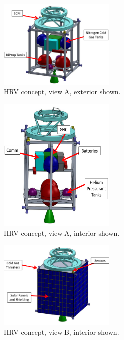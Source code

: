 \documentclass[paper=letter, fontsize=11pt]{scrartcl} %
\numberwithin{equation}{section} %
\numberwithin{figure}{section} %
\numberwithin{table}{section} %
\begin{document}
\begin{figure}[H]
    \begin{center}
        \includegraphics[width=0.5\textwidth]{Pics/1.png}
        \caption{HRV concept, view A, exterior shown.}
        \label{fig:p1}
    \end{center}
\end{figure}

\begin{figure}[H]
    \begin{center}
        \includegraphics[width=0.5\textwidth]{Pics/2.png}
        \caption{HRV concept, view A, interior shown.}
        \label{fig:p2}
    \end{center}
\end{figure}

\begin{figure}[H]
    \begin{center}
        \includegraphics[width=0.5\textwidth]{Pics/3.png}
        \caption{HRV concept, view B, interior shown.}
        \label{fig:p3}
    \end{center}
\end{figure}
\end{document}
